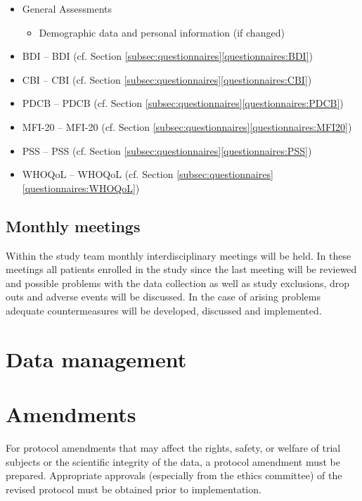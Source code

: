 \begin{itemize}[noitemsep,topsep=0pt]
\item General Assessments
\begin{itemize}[noitemsep,topsep=0pt]
\item Demographic data and personal information (if changed)
\end{itemize}
\item \acl{BDI} -- \acs{BDI} (cf. Section \ref{subsec:questionnaires}\ref{questionnaires:BDI})
\item \acl{CBI} -- \acs{CBI} (cf. Section \ref{subsec:questionnaires}\ref{questionnaires:CBI})
\item \acl{PDCB} -- \acs{PDCB} (cf. Section \ref{subsec:questionnaires}\ref{questionnaires:PDCB})
\item \acl{MFI-20} -- \acs{MFI-20} (cf. Section \ref{subsec:questionnaires}\ref{questionnaires:MFI20})
\item \acl{PSS} -- \acs{PSS} (cf. Section \ref{subsec:questionnaires}\ref{questionnaires:PSS})
\item \acl{WHOQoL} -- \acs{WHOQoL} (cf. Section \ref{subsec:questionnaires}\ref{questionnaires:WHOQoL})
\end{itemize}

\subsection{Monthly meetings}
Within the study team monthly interdisciplinary meetings will be held. In these meetings all patients enrolled in the study since the last meeting will be reviewed and possible problems with the data collection as well as study exclusions, drop outs and adverse events will be discussed. In the case of arising problems adequate countermeasures will be developed, discussed and implemented.

\section{Data management}

\section{Amendments}
For protocol amendments that may affect the rights, safety, or welfare of trial subjects or the scientific integrity of the data, a protocol amendment must be prepared. Appropriate approvals (especially from the ethics committee) of the revised protocol must be obtained prior to implementation.

